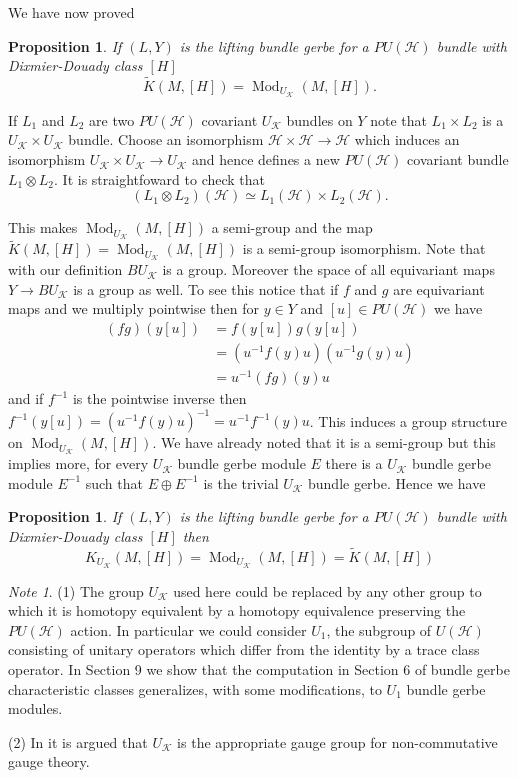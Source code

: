\documentclass[a4paper,reqno]{amsart}
\DeclareMathOperator{\Mod}{Mod}
\theoremstyle{plain}
\newtheorem{proposition}[theorem]{Proposition}
\theoremstyle{definition}
\theoremstyle{remark}
\newtheorem{note}{Note}[section]
\numberwithin{equation}{section}
\numberwithin{figure}{section}
\newcommand{\cH}{{\mathcal H}}
\newcommand{\redK}{\widetilde K} %
\newcommand{\UK}{U{_\mathcal K}}
\newcommand{\<}{\langle}
\renewcommand{\>}{\rangle}
\begin{document}
We have now proved
\begin{proposition}
\label{prop:U_K bg modules equals K(M;H)} 
If $(L, Y)$ is the lifting bundle gerbe for a $PU(\cH)$
bundle with Dixmier-Douady class $[H]$
$$
\redK(M, [H]) =  \Mod_{\UK}(M, [H]) .
$$
\end{proposition}

If $L_1$ and $L_2$ are two $PU(\cH)$ covariant $U{_\mathcal K}$ bundles
on $Y$ note that
$L_1 \times L_2$ is a $U{_\mathcal K} \times U{_\mathcal K}$ bundle.
Choose an
isomorphism $\cH \times \cH \to \cH$ which induces an isomorphism
$U{_\mathcal K} \times U{_\mathcal K} \to U{_\mathcal K}$ and hence defines a
new $PU(\cH)$ covariant bundle $L_1 \otimes L_2$.  It is straightfoward
to check that
$$
(L_1 \otimes L_2 )(\cH) \simeq L_1(\cH) \times L_2(\cH).
$$

This makes $\Mod_{\UK}(M, [H])$ a semi-group and the map
$\redK(M, [H]) =  \Mod_{\UK}(M, [H])$ is a semi-group isomorphism.
Note that with our definition $B\UK$ is a group. Moreover
the space of all equivariant maps $Y \to B\UK$ is a group as well.
To see this notice that if
   $f$ and $g$ are equivariant maps and we multiply
pointwise then for  $y \in Y$ and $[u] \in PU(\cH)$ we have
\begin{align*}
(fg)(y[u]) &= f(y[u]) g(y[u]) \\
            &= (u^{-1} f(y) u) (u^{-1} g(y) u) \\
            &= u^{-1}(fg)(y) u
\end{align*}
and if $f^{-1}$ is the pointwise inverse then  $f^{-1}(y[u]) =
\left( u^{-1} f(y) u \right)^{-1} = u^{-1} f^{-1}(y) u$.
This induces a group structure on $\Mod_{\UK}(M, [H])$. We have already
noted that it is a semi-group but this implies more, for every $\UK$ bundle
gerbe module $E$ there is a $\UK$ bundle gerbe module  
$E^{-1}$ such that $E \oplus E^{-1}$
is the trivial $\UK$ bundle gerbe. Hence we have

\begin{proposition} If $(L, Y)$ is the lifting bundle gerbe for a $PU(\cH)$
bundle with Dixmier-Douady class $[H]$ then
$$
    K_{\UK}(M, [H]) = \Mod_{\UK}(M, [H])  = \redK(M, [H])
$$
\end{proposition}


\begin{note}
\label{note:replace U_K with U_1} 
(1) The group $\UK$ used here could be replaced by any
other group to which it is homotopy equivalent by a homotopy
equivalence preserving the $PU(\cH)$ action.  In particular we 
could consider $U_1$, the subgroup of $U(\cH)$ consisting 
of unitary operators which differ from the identity by a 
trace class operator.   
In Section 9 we show that the computation in Section 6 of bundle gerbe
characteristic classes generalizes, with some modifications, to
$U_1$ bundle gerbe modules.  

(2) In \cite{Har} it is argued that $\UK$ is the appropriate gauge
group for non-commutative gauge theory.
\end{note}
\end{document}
